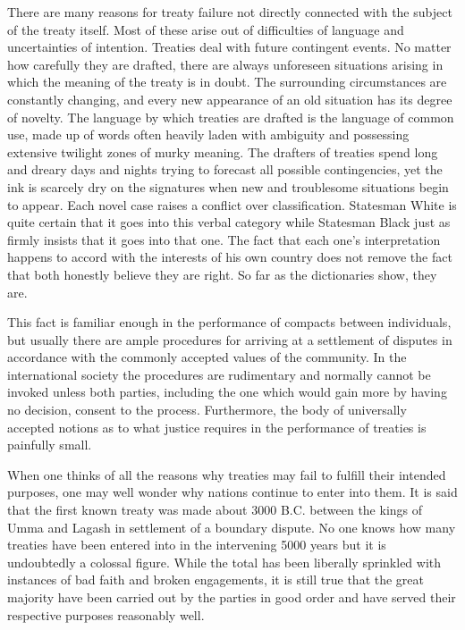 \begin{introduction}
There are many reasons for treaty failure not directly connected with the subject of the treaty itself. Most of these arise out of difficulties of language and uncertainties of intention. Treaties deal with future contingent events. No matter how carefully they are drafted, there are always unforeseen situations arising in which the meaning of the treaty is in doubt. The surrounding circumstances are constantly changing, and every new appearance of an old situation has its degree of novelty. The language by which treaties are drafted is the language of common use, made up of words often heavily laden with ambiguity and possessing extensive twilight zones of murky meaning. The drafters of treaties spend long and dreary days and nights trying to forecast all possible contingencies, yet the ink is scarcely dry on the signatures when new and troublesome situations begin to appear. Each novel case raises a conflict over classification. Statesman White is quite certain that it goes into this verbal category while Statesman Black just as firmly insists that it goes into that one. The fact that each one's interpretation happens to accord with the interests of his own country does not remove the fact that both honestly believe they are right. So far as the dictionaries show, they are.

This fact is familiar enough in the performance of compacts between individuals, but usually there are ample procedures for arriving at a settlement of disputes in accordance with the commonly accepted values of the community. In the international society the procedures are rudimentary and normally cannot be invoked unless both parties, including the one which would gain more by having no decision, consent to the process. Furthermore, the body of universally accepted notions as to what justice requires in the performance of treaties is painfully small.

When one thinks of all the reasons why treaties may fail to fulfill their intended purposes, one may well wonder why nations continue to enter into them. It is said that the first known treaty was made about 3000 B.C. between the kings of Umma and Lagash in settlement of a boundary dispute. No one knows how many treaties have been entered into in the intervening 5000 years but it is undoubtedly a colossal figure. While the total has been liberally sprinkled with instances of bad faith and broken engagements, it is still true that the great majority have been carried out by the parties in good order and have served their respective purposes reasonably well.


\end{introduction}
